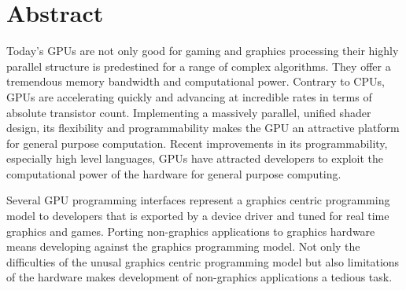\begingroup
\let\clearpage\relax
\let\cleardoublepage\relax
\let\cleardoublepage\relax
{}
\section*{Abstract}
Today's \glspl{GPU} are not only good for gaming and graphics processing their
highly parallel structure is predestined for a range of complex algorithms. They
offer a tremendous memory bandwidth and computational power. Contrary to
CPUs, \glspl{GPU} are accelerating quickly and advancing at incredible rates in
terms of absolute transistor count. Implementing a massively parallel, unified
shader design, its flexibility and programmability makes the \gls{GPU} an
attractive platform for general purpose computation. Recent improvements in its
programmability, especially high level languages, \glspl{GPU} have attracted
developers to exploit the computational power of the hardware for general
purpose computing.

Several \gls{GPU} programming interfaces represent a graphics centric
programming model to developers that is exported by a device driver and tuned
for real time graphics and games. Porting non-graphics applications to graphics
hardware means developing against the graphics programming model. Not only the
difficulties of the unusal graphics centric programming model but also
limitations of the hardware makes development of non-graphics applications a
tedious task.

